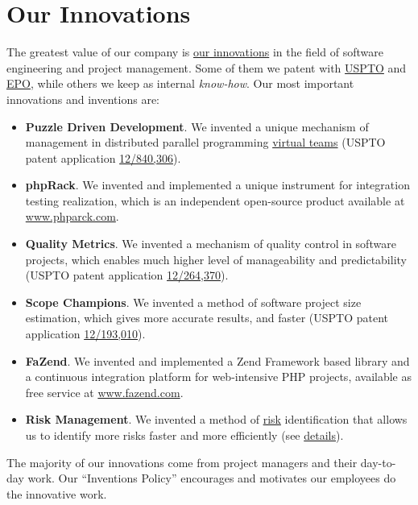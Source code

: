 
\section*{Our Innovations}

The greatest value of our company is \href{${url:innovations}}{our innovations} in the field
of software engineering and project management. Some of them we patent with 
\href{http://www.uspto.gov}{USPTO} and \href{http://www.epo.org}{EPO}, while
others we keep as internal \textit{know-how}. Our most important innovations and inventions
are:

	\begin{itemize}
    	\item \textbf{Puzzle Driven Development}. 
    	We invented a unique mechanism of management in distributed parallel programming
    	\href{${url:about/teams}}{virtual teams}
    	(USPTO patent application \href{${url:innovations/pdd}}{12/840,306}).

    	\item \textbf{phpRack}.
    	We invented and implemented a unique instrument for
    	integration testing realization, which is an
    	independent open-source product available 
    	at \href{http://www.phprack.com}{www.phparck.com}.

    	\item \textbf{Quality Metrics}. 
    	We invented a mechanism of quality control in software projects, which
    	enables much higher level of manageability and predictability
    	(USPTO patent application \href{${url:innovations/metrics}}{12/264,370}).

    	\item \textbf{Scope Champions}.
    	We invented a method of software project size estimation, which 
    	gives more accurate results, and faster
    	(USPTO patent application \href{${url:innovations/scope-champions}}{12/193,010}). 

    	\item \textbf{FaZend}.
    	We invented and implemented a Zend Framework based
    	library and a continuous integration platform for web-intensive
    	PHP projects, available as free service
    	at \href{http://www.fazend.com}{www.fazend.com}.

    	\item \textbf{Risk Management}. 
    	We invented a method of \href{${url:process/risk}}{risk} identification
    	that allows us to identify more risks faster and more efficiently
    	(see \href{${url:innovations/risk-game}}{details}).
	\end{itemize}

The majority of our innovations come from project managers and their
day-to-day work. Our ``Inventions Policy'' encourages and motivates our employees
do the innovative work.
